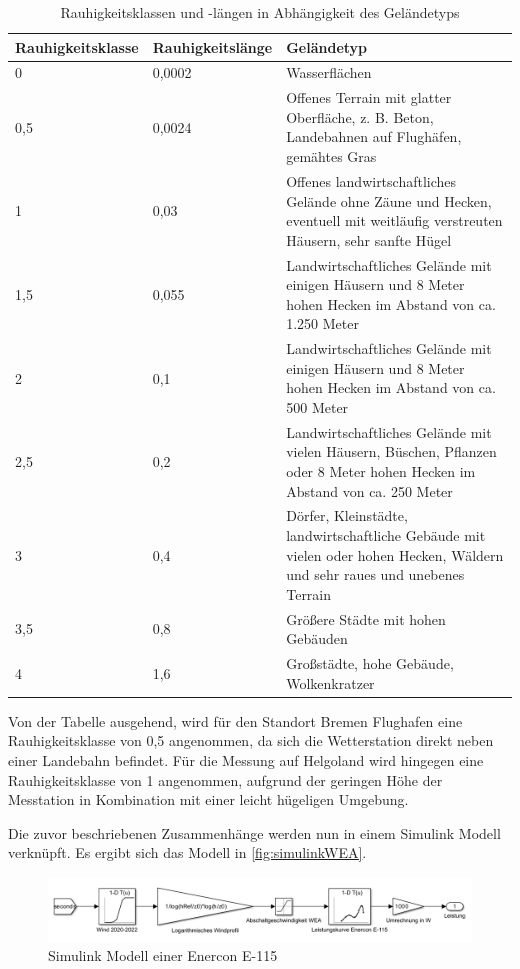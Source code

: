 \begin{table} [H]
	\begin{tabular}[htpb]{p{4cm}|p{3cm}|p{7cm}}
		\textbf{Rauhigkeitsklasse} & \textbf{Rauhigkeitslänge} & \textbf{Geländetyp} \\
		\hline
		0 & 0,0002 & Wasserflächen \\
		\hline
		0,5 & 0,0024 & Offenes Terrain mit glatter Oberfläche, z. B. Beton, Landebahnen auf Flughäfen, gemähtes Gras \\
		\hline
		1 & 0,03 & Offenes landwirtschaftliches Gelände ohne Zäune und Hecken, eventuell mit weitläufig verstreuten Häusern, sehr sanfte Hügel \\
		\hline
		1,5 & 0,055 & Landwirtschaftliches Gelände mit einigen Häusern und 8 Meter hohen Hecken im Abstand von ca. 1.250 Meter \\
		\hline
		2 & 0,1 & Landwirtschaftliches Gelände mit einigen Häusern und 8 Meter hohen Hecken im Abstand von ca. 500 Meter \\
		\hline
		2,5 & 0,2 & Landwirtschaftliches Gelände mit vielen Häusern, Büschen, Pflanzen oder 8 Meter hohen Hecken im Abstand von ca. 250 Meter \\
		\hline
		3 & 0,4 & Dörfer, Kleinstädte, landwirtschaftliche Gebäude mit vielen oder hohen Hecken, Wäldern und sehr raues und unebenes Terrain \\
		\hline
		3,5 & 0,8 & Größere Städte mit hohen Gebäuden \\
		\hline
		4 & 1,6 & Großstädte, hohe Gebäude, Wolkenkratzer \\
	\end{tabular}
\centering
\caption{Rauhigkeitsklassen und -längen in Abhängigkeit des Geländetyps \cite{Rauigkeit}}
\label{tab:Rauigkeit}
\end{table}

Von der Tabelle ausgehend, wird für den Standort Bremen Flughafen eine Rauhigkeitsklasse von 0,5 angenommen, da sich die Wetterstation direkt neben einer Landebahn befindet. Für die Messung auf Helgoland wird hingegen eine Rauhigkeitsklasse von 1 angenommen, aufgrund der geringen Höhe der Messtation in Kombination mit einer leicht hügeligen Umgebung.

Die zuvor beschriebenen Zusammenhänge werden nun in einem Simulink Modell verknüpft. Es ergibt sich das Modell in \autoref{fig:simulinkWEA}.

\begin{figure}[H]
	\centering
	\includegraphics[width=0.9\linewidth]{Abbildungen/ModellWEAeinfach.png}
	\caption{Simulink Modell einer Enercon E-115}
	\label{fig:simulinkWEA}
\end{figure}

